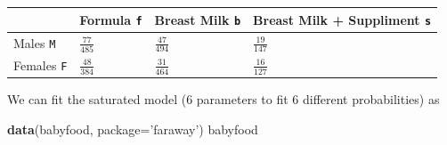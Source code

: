 \documentclass[]{book}
\newenvironment{Shaded}{\begin{snugshade}}{\end{snugshade}}
\newcommand{\KeywordTok}[1]{\textcolor[rgb]{0.13,0.29,0.53}{\textbf{{#1}}}}
\newcommand{\DataTypeTok}[1]{\textcolor[rgb]{0.13,0.29,0.53}{{#1}}}
\newcommand{\StringTok}[1]{\textcolor[rgb]{0.31,0.60,0.02}{{#1}}}
\newcommand{\NormalTok}[1]{{#1}}
\theoremstyle{definition}
\theoremstyle{definition}
\theoremstyle{remark}
\begin{document}
\begin{longtable}[]{@{}llll@{}}
\toprule
\begin{minipage}[b]{0.17\columnwidth}\raggedright\strut
\strut
\end{minipage} & \begin{minipage}[b]{0.20\columnwidth}\raggedright\strut
Formula \texttt{f}\strut
\end{minipage} & \begin{minipage}[b]{0.20\columnwidth}\raggedright\strut
Breast Milk \texttt{b}\strut
\end{minipage} & \begin{minipage}[b]{0.32\columnwidth}\raggedright\strut
Breast Milk + Suppliment \texttt{s}\strut
\end{minipage}\tabularnewline
\midrule
\endhead
\begin{minipage}[t]{0.17\columnwidth}\raggedright\strut
Males \texttt{M}\strut
\end{minipage} & \begin{minipage}[t]{0.20\columnwidth}\raggedright\strut
\(\frac{77}{485}\)\strut
\end{minipage} & \begin{minipage}[t]{0.20\columnwidth}\raggedright\strut
\(\frac{47}{494}\)\strut
\end{minipage} & \begin{minipage}[t]{0.32\columnwidth}\raggedright\strut
\(\frac{19}{147}\)\strut
\end{minipage}\tabularnewline
\begin{minipage}[t]{0.17\columnwidth}\raggedright\strut
Females \texttt{F}\strut
\end{minipage} & \begin{minipage}[t]{0.20\columnwidth}\raggedright\strut
\(\frac{48}{384}\)\strut
\end{minipage} & \begin{minipage}[t]{0.20\columnwidth}\raggedright\strut
\(\frac{31}{464}\)\strut
\end{minipage} & \begin{minipage}[t]{0.32\columnwidth}\raggedright\strut
\(\frac{16}{127}\)\strut
\end{minipage}\tabularnewline
\bottomrule
\end{longtable}

We can fit the saturated model (6 parameters to fit 6 different
probabilities) as

\begin{Shaded}
\begin{Highlighting}[]
\KeywordTok{data}\NormalTok{(babyfood, }\DataTypeTok{package=}\StringTok{'faraway'}\NormalTok{)}
\NormalTok{babyfood}
\end{Highlighting}
\end{Shaded}
\end{document}
